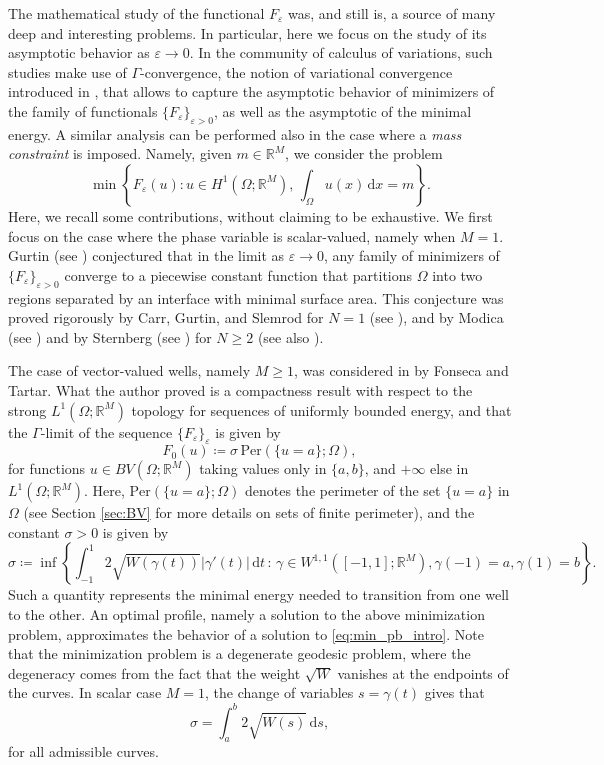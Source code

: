 \documentclass[a4paper, 11pt, reqno]{amsart}
\theoremstyle{plain}
\theoremstyle{definition}
\theoremstyle{remark}
\newcommand{\R}{\mathbb R}
\newcommand{\dd}{\,\mathrm{d}}
\begin{document}
The mathematical study of the functional $F_\varepsilon$ was, and still is, a source of many deep and interesting problems.
In particular, here we focus on the study of its asymptotic behavior as $\varepsilon\to0$.
In the community of calculus of variations, such studies make use of $\Gamma$-convergence, the notion of variational convergence introduced in \cite{DGFra}, that allows to capture the asymptotic behavior of minimizers of the family of functionals $\{F_\varepsilon\}_{\varepsilon>0}$, as well as the asymptotic of the minimal energy.
A similar analysis can be performed also in the case where a \emph{mass constraint} is imposed. Namely, given $m\in\R^M$, we consider the problem
\begin{equation}\label{eq:min_pb_intro}
\min\left\{ F_\varepsilon(u) : u\in H^1(\Omega;\R^M), \, \int_\Omega u(x)\dd x = m  \right\}.
\end{equation}
Here, we recall some contributions, without claiming to be exhaustive.
We first focus on the case where the phase variable is scalar-valued, namely when $M=1$.
Gurtin (see \cite{Gur}) conjectured that in the limit as $\varepsilon\to0$, any family of minimizers of $\{F_\varepsilon\}_{\varepsilon>0}$ converge to a piecewise constant function that partitions $\Omega$ into two regions separated by an interface with minimal surface area.
This conjecture was proved rigorously 
by Carr, Gurtin, and Slemrod for $N = 1$ (see \cite{CarGurSle}), and by Modica (see \cite{modica87}) and by Sternberg (see \cite{Ste_Sing}) for $N \ge 2$ (see also \cite{ModMor_Limite, ModMor_Esempio}).

The case of vector-valued wells, namely $M\geq 1$, was considered in \cite{FonTar} by Fonseca and Tartar.
What the author proved is a compactness result with respect to the strong $L^1(\Omega;\R^M)$ topology for sequences of uniformly bounded energy, and that the $\Gamma$-limit of the sequence $\{F_\varepsilon\}_\varepsilon$ is given by
\[
F_0(u)\coloneqq \sigma\,\mathrm{Per}(\{u=a\};\Omega),
\]
for functions $u\in BV(\Omega;\R^M)$ taking values only in $\{a,b\}$, and $+\infty$ else in $L^1(\Omega;\R^M)$.
Here, $\mathrm{Per}(\{u=a\};\Omega)$ denotes the perimeter of the set $\{u=a\}$ in $\Omega$ (see Section \ref{sec:BV} for more details on sets of finite perimeter), and the constant $\sigma>0$ is given by
\begin{equation}\label{eq:sigma_intro}
\sigma\coloneqq \inf\left\{\int_{-1}^1 2\sqrt{W(\gamma(t))}|\gamma'(t)|\dd t \,:\, \gamma\in W^{1,1}([-1,1];\R^M), \gamma(-1)=a, \gamma(1)=b \right\}.
\end{equation}
Such a quantity represents the minimal energy needed to transition from one well to the other.
An optimal profile, namely a solution to the above minimization problem, approximates the behavior of a solution to \eqref{eq:min_pb_intro}.
Note that the minimization problem is a degenerate geodesic problem, where the degeneracy comes from the fact that the weight $\sqrt{W}$ vanishes at the endpoints of the curves.
In scalar case $M=1$, the change of variables $s=\gamma(t)$ gives that
\begin{equation}\label{eq:sigma_scalar_intro}
\sigma = \int_a^b 2\sqrt{W(s)}\dd s,
\end{equation}
for all admissible curves.
\end{document}
